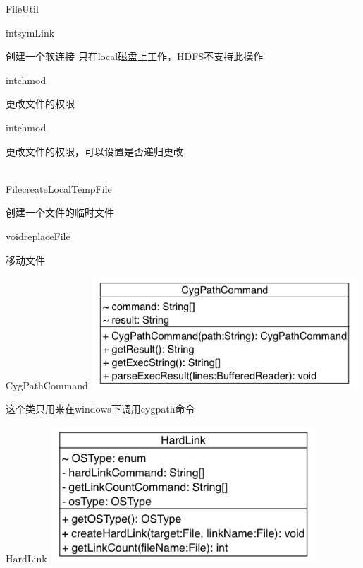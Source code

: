 \begin{XeClass}{FileUtil}
    \begin{XeMethod}{\XePublic}{int}{symLink}
         
 创建一个软连接
 只在local磁盘上工作，HDFS不支持此操作

    \end{XeMethod}

    \begin{XeMethod}{\XePublic}{int}{chmod}
         
 更改文件的权限

    \end{XeMethod}

    \begin{XeMethod}{\XePublic}{int}{chmod}
         
 更改文件的权限，可以设置是否递归更改

    \end{XeMethod}

    \begin{XeMethod}{\XePublic \\ \XeFinal}{File}{createLocalTempFile}
         
 创建一个文件的临时文件

    \end{XeMethod}

    \begin{XeMethod}{\XePublic}{void}{replaceFile}
         
 移动文件

    \end{XeMethod}

    \begin{XeInnerClass}{CygPathCommand}
\includegraphics[width=10cm]{cdig/CygPathCommand.png}
         
 这个类只用来在windows下调用cygpath命令

    \end{XeInnerClass}
    \begin{XeInnerClass}{HardLink}
\includegraphics[width=10cm]{cdig/HardLink.png}
         

\end{XeInnerClass}
\end{XeClass}
